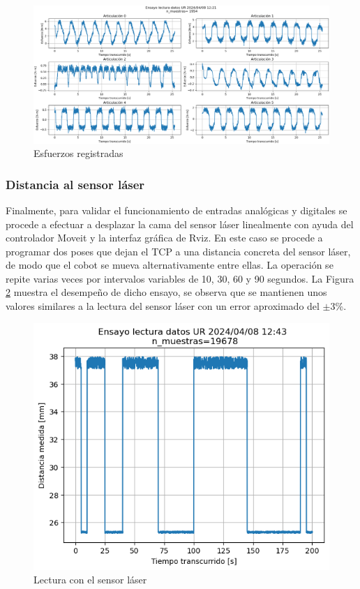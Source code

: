 \begin{figure}[h!]
    \centering
    \includegraphics[scale=0.4]{figuras/ensayo_lectura_datos/esfuerzo_sacacorchos.png}
    \caption{Esfuerzos registradas}
    \label{fig:trayectoria sacacorchos esfuerzos}
\end{figure}

\subsubsection*{Distancia al sensor láser}
\hypertarget{Distancia al sensor láser}{}
Finalmente, para validar el funcionamiento de entradas analógicas y digitales se procede a efectuar a desplazar la cama del sensor láser linealmente con ayuda del controlador Moveit y la interfaz gráfica de Rviz. En este caso se procede a programar dos poses que dejan el \acrshort{TCP} a una distancia concreta del sensor láser, de modo que el cobot se mueva alternativamente entre ellas. La operación se repite varias veces por intervalos variables de 10, 30, 60 y 90 segundos. La Figura \ref{fig:lectura con el sensor laser} muestra el desempeño de dicho ensayo, se observa que se mantienen unos valores similares a la lectura del sensor láser con un error aproximado del $\pm$3\%.

\begin{figure}[h!]
    \centering
    \includegraphics[scale=0.5]{figuras/ensayo_lectura_datos/lectura_datos_distancia_laser.png}
    \caption{Lectura con el sensor láser}
    \label{fig:lectura con el sensor laser}
\end{figure}

